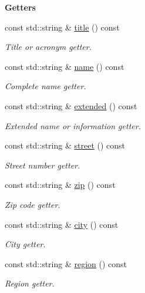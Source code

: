 \begin{Indent}{\bf Getters}\par
\begin{DoxyCompactItemize}
\item 
const std\-::string \& \hyperlink{exceptionmagrathea_1_1AboutInstitute_a51cc6e7105ea8748edea926cb8f51bca}{title} () const 
\begin{DoxyCompactList}\small\item\em Title or acronym getter. \end{DoxyCompactList}\item 
const std\-::string \& \hyperlink{exceptionmagrathea_1_1AboutInstitute_a252a5f564549825de9eeb20851dd82d5}{name} () const 
\begin{DoxyCompactList}\small\item\em Complete name getter. \end{DoxyCompactList}\item 
const std\-::string \& \hyperlink{exceptionmagrathea_1_1AboutInstitute_abb9c1731aa101e6c7b8cc58e17ef132e}{extended} () const 
\begin{DoxyCompactList}\small\item\em Extended name or information getter. \end{DoxyCompactList}\item 
const std\-::string \& \hyperlink{exceptionmagrathea_1_1AboutInstitute_ac236c38b6d89a445d80ec871ccde3f98}{street} () const 
\begin{DoxyCompactList}\small\item\em Street number getter. \end{DoxyCompactList}\item 
const std\-::string \& \hyperlink{exceptionmagrathea_1_1AboutInstitute_a3639b5a8a41de255fdebbd39868eb9dc}{zip} () const 
\begin{DoxyCompactList}\small\item\em Zip code getter. \end{DoxyCompactList}\item 
const std\-::string \& \hyperlink{exceptionmagrathea_1_1AboutInstitute_a396b623cbd3a9bbc0977c0617b4790f3}{city} () const 
\begin{DoxyCompactList}\small\item\em City getter. \end{DoxyCompactList}\item 
const std\-::string \& \hyperlink{exceptionmagrathea_1_1AboutInstitute_aa028889cc715c9dcdfba64215bac5df2}{region} () const 
\begin{DoxyCompactList}\small\item\em Region getter. \end{DoxyCompactList}\item 

\end{DoxyCompactItemize}
\end{Indent}
